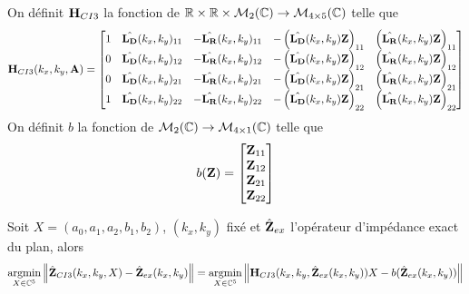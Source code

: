     \begin{defn}
      On définit \(\mathbf{H}_{CI3}\) la fonction de \(\mathbb R \times \mathbb R \times \mathcal{M}_2(\mathbb C) \rightarrow \mathcal{M}_{4\times5}(\mathbb C)\) telle que
      \begin{equation*}
        \mathbf{H}_{CI3}(k_x,k_y,\mathbf{A}) = \begin{bmatrix}
        1 & \hat{\mathbf{L_D}}(k_x,k_y)_{11} & -\hat{\mathbf{L_R}}(k_x,k_y)_{11} & -\left(\hat{\mathbf{L_D}}(k_x,k_y)\mathbf{Z}\right)_{11} & \left(\hat{\mathbf{L_R}}(k_x,k_y)\mathbf{Z}\right)_{11}
        \\
        0 & \hat{\mathbf{L_D}}(k_x,k_y)_{12} & -\hat{\mathbf{L_R}}(k_x,k_y)_{12} & -\left(\hat{\mathbf{L_D}}(k_x,k_y)\mathbf{Z}\right)_{12} & \left(\hat{\mathbf{L_R}}(k_x,k_y)\mathbf{Z}\right)_{12}
        \\
        0 & \hat{\mathbf{L_D}}(k_x,k_y)_{21} & -\hat{\mathbf{L_R}}(k_x,k_y)_{21} & -\left(\hat{\mathbf{L_D}}(k_x,k_y)\mathbf{Z}\right)_{21} & \left(\hat{\mathbf{L_R}}(k_x,k_y)\mathbf{Z}\right)_{21}
        \\
        1 & \hat{\mathbf{L_D}}(k_x,k_y)_{22} & -\hat{\mathbf{L_R}}(k_x,k_y)_{22} & -\left(\hat{\mathbf{L_D}}(k_x,k_y)\mathbf{Z}\right)_{22} & \left(\hat{\mathbf{L_R}}(k_x,k_y)\mathbf{Z}\right)_{22}
        \end{bmatrix}
      \end{equation*}
      On définit \(b\) la fonction de \(\mathcal{M}_2(\mathbb C) \rightarrow \mathcal{M}_{4\times1}(\mathbb C)\) telle que
      \begin{equation*}
        b(\mathbf{Z}) = \begin{bmatrix}
        \mathbf{Z}_{11}
        \\
        \mathbf{Z}_{12}
        \\
        \mathbf{Z}_{21}
        \\
        \mathbf{Z}_{22}
        \end{bmatrix}
      \end{equation*}
    \end{defn}

    \begin{prop}
      Soit \(X = (a_0,a_1,a_2,b_1,b_2)\), \((k_x,k_y)\) fixé et \(\hat{\mathbf{Z}}_{ex}\) l'opérateur d'impédance exact du plan, alors
      \begin{equation*}
        {\underset{X\in\mathbb C^5}{\operatorname{argmin}}} \left\lVert\hat{\mathbf{Z}}_{CI3}(k_x,k_y,X) - \hat{\mathbf{Z}}_{ex}(k_x,k_y)\right\rVert = {\underset{X\in\mathbb C^5}{\operatorname{argmin}}} \left\lVert\mathbf{H}_{CI3}(k_x,k_y,\hat{\mathbf{Z}}_{ex}(k_x,k_y))X - b(\hat{\mathbf{Z}}_{ex}(k_x,k_y))\right\rVert
      \end{equation*}
    \end{prop}

